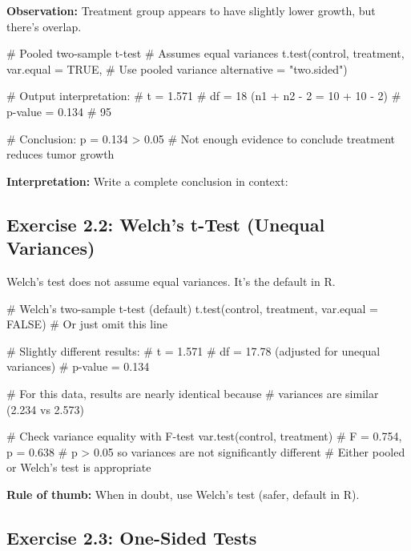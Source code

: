 \documentclass[11pt]{article}
\begin{document}
\textbf{Observation:} Treatment group appears to have slightly lower growth, but there's overlap.

\newpage

\begin{rcode}
# Pooled two-sample t-test
# Assumes equal variances
t.test(control, treatment,
       var.equal = TRUE,         # Use pooled variance
       alternative = "two.sided")

# Output interpretation:
# t = 1.571
# df = 18 (n1 + n2 - 2 = 10 + 10 - 2)
# p-value = 0.134
# 95%

# Conclusion: p = 0.134 > 0.05
# Not enough evidence to conclude treatment reduces tumor growth
\end{rcode}

\textbf{Interpretation:} Write a complete conclusion in context:

\vspace{2cm}

\subsection{Exercise 2.2: Welch's t-Test (Unequal Variances)}

Welch's test does not assume equal variances. It's the default in R.

\begin{rcode}
# Welch's two-sample t-test (default)
t.test(control, treatment,
       var.equal = FALSE)  # Or just omit this line

# Slightly different results:
# t = 1.571
# df = 17.78 (adjusted for unequal variances)
# p-value = 0.134

# For this data, results are nearly identical because
# variances are similar (2.234 vs 2.573)

# Check variance equality with F-test
var.test(control, treatment)
# F = 0.754, p = 0.638
# p > 0.05 so variances are not significantly different
# Either pooled or Welch's test is appropriate
\end{rcode}

\textbf{Rule of thumb:} When in doubt, use Welch's test (safer, default in R).

\vspace{1cm}

\subsection{Exercise 2.3: One-Sided Tests}
\end{document}
